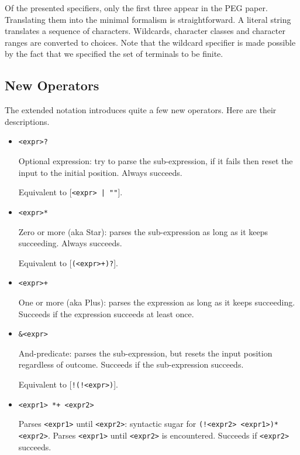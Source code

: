 Of the presented specifiers, only the first three appear in the PEG
paper. Translating them into the minimal formalism is straightforward. A literal
string translates a sequence of characters. Wildcards, character classes and
character ranges are converted to choices. Note that the wildcard specifier is
made possible by the fact that we specified the set of terminals to be finite.

\subsection{New Operators}

The extended notation introduces quite a few new operators. Here are their
descriptions.

\begin{itemize}

\item \lstinline{<expr>?}

  Optional expression: try to parse the sub-expression, if it fails then reset
  the input to the initial position. Always succeeds.

  Equivalent to [\lstinline{<expr> | ""}].

\item \lstinline{<expr>*}

  Zero or more (aka Star): parses the sub-expression as long as it keeps
  succeeding. Always succeeds.

  Equivalent to [\lstinline{(<expr>+)?}].

\item \lstinline{<expr>+}

  One or more (aka Plus): parses the expression as long as it keeps
  succeeding. Succeeds if the expression succeeds at least once.

\item \lstinline{&<expr>}

  And-predicate: parses the sub-expression, but resets the input position
  regardless of outcome. Succeeds if the sub-expression succeeds.

  Equivalent to [\lstinline{!(!<expr>)}].

\item \lstinline{<expr1> *+ <expr2>}

  Parses \texttt{<expr1>} until \texttt{<expr2>}: syntactic sugar for
  \texttt{(!<expr2> <expr1>)* <expr2>}. Parses \texttt{<expr1>} until
  \texttt{<expr2>} is encountered. Succeeds if \texttt{<expr2>} succeeds.


\end{itemize}
